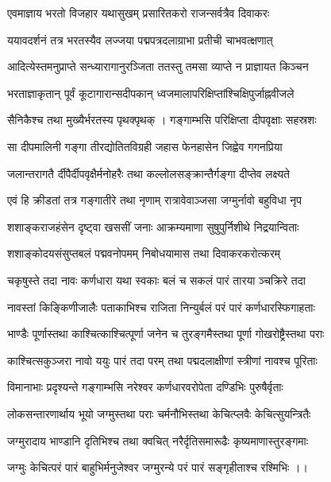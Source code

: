 \twolineshloka
{एवमाज्ञाय भरतो विजहार यथासुखम्}
{प्रसारितकरो राजन्सर्वत्रैव दिवाकरः}%

\twolineshloka
{ययावदर्शनं तत्र भरतस्यैव लज्जया}
{पद्मपत्रदलाग्राभा प्रतीची चाभवत्क्षणात्}%

\twolineshloka
{आदित्येस्तमनुप्राप्ते सन्ध्यारागानुरञ्जिता}
{ततस्तु तमसा व्याप्ते न प्राज्ञायत किञ्चन}%

\twolineshloka
{भरताज्ञाकृतान् पूर्वं कूटागारान्सदीपकान्}
{ध्वजमालापरिक्षिप्तांश्चिक्षिपुर्जाह्नवीजले}%

\twolineshloka
{सैनिकैश्च तथा मुख्यैर्भरतस्य पृथक्पृथक् ।}
{गङ्गाम्भसि परिक्षिप्ता दीपवृक्षाः सहस्रशः}%

\twolineshloka
{सा दीपमालिनी गङ्गा तीरद्योतितविग्रही}
{जहास फेनहासेन जिह्वेव गगनप्रिया}%

\twolineshloka
{जलान्तरागतै र्दीपैर्दीपवृक्षैर्मनोहरैः}
{तथा कल्लोलसङ्क्रान्तैर्गङ्गा दीप्तेव लक्ष्यते}%

\twolineshloka
{एवं हि क्रीडतां तत्र गङ्गातीरे तथा नृणाम्}
{रात्रावेवाञ्जसा जग्मुर्नावो बहुविधा नृप}%

\twolineshloka
{शशाङ्कराजहंसेन दृष्ट्वा खससीं जनाः}
{आक्रम्यमाणा सुषुपुर्निशीथे निद्रयान्विताः} %

\twolineshloka
{शशाङ्कोदयसंसुप्तबलं पद्मवनोपमम्}
{निबोधयामास तथा दिवाकरकरोत्करम्}%

\twolineshloka
{चकृषुस्ते तदा नावः कर्णधारा यथा स्वकाः}
{बलं च सकलं पारं तारया ञ्चक्रिरे तदा}%

\twolineshloka
{नावस्तां किङ्किणीजालैः पताकाभिश्च राजिता}
{निन्युर्बलं परं पारं कर्णधारस्फिगाहताः}%

\twolineshloka
{भाण्डैः पूर्णास्तथा काश्चित्काश्चित्पूर्णा जनेन च}
{तुरङ्गमैस्तथा पूर्णा गोखरोष्ट्रैस्तथा पराः}%

\twolineshloka
{काश्चित्सकुञ्जरा नावो ययुः पारं तदा परम्}
{तथा पद्मदलाक्षीणां स्त्रीणां नावश्च पूरिताः}%

\twolineshloka
{विमानाभाः प्रदृश्यन्ते गङ्गाम्भसि नरेश्वर}
{कर्णधारवरोपेता दण्डिभिः पुरुषैर्वृताः}%

\twolineshloka
{लोकसन्तारणार्थाय भूयो जग्मुस्तथा पराः}
{चर्मनौभिस्तथा केचित्प्लवैः केचित्सुयन्त्रितैः}%

\twolineshloka
{जग्मुरादाय भाण्डानि दृतिभिश्च तथा क्वचित्}
{नरैर्दृतिसमारूढैः कृष्यमाणास्तुरङ्गमाः}%

\twolineshloka
{जग्मुः केचित्परं पारं बाहुभिर्मनुजेश्वर}
{जग्मुरन्ये परं पारं सङ्गृहीताश्च रश्मिभिः ।।}%

